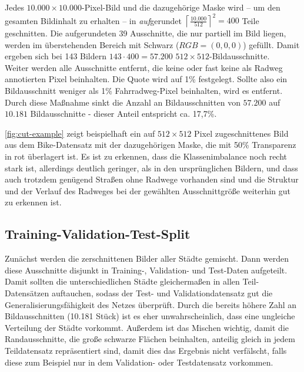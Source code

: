 Jedes $10.000\times 10.000$-Pixel-Bild und die dazugehörige Maske wird -- um den gesamten Bildinhalt zu erhalten -- in \textit{auf}gerundet
$\left\lceil{\frac{10.000}{512}}\right\rceil^2 = 400$ Teile geschnitten. 
Die aufgerundeten 39 Ausschnitte, die nur partiell im Bild liegen, werden im überstehenden Bereich mit Schwarz ($RGB=(0,0,0)$) gefüllt.
Damit ergeben sich bei 143 Bildern $143 \cdot 400 = 57.200$ $512 \times 512$-Bildausschnitte. \\
Weiter werden alle Ausschnitte entfernt, die keine oder fast keine als Radweg annotierten Pixel beinhalten. 
Die Quote wird auf 1\% festgelegt. Sollte also ein Bildausschnitt weniger als 1\% Fahrradweg-Pixel beinhalten, 
wird es entfernt. Durch diese Maßnahme sinkt die Anzahl an Bildausschnitten von $57.200$ auf $10.181$ Bildausschnitte - 
dieser Anteil entspricht ca. 17,7\%. 
 
\autoref{fig:cut-example} zeigt beispielhaft ein auf $512\times 512$ Pixel zugeschnittenes Bild aus dem Bike-Datensatz 
mit der dazugehörigen Maske, die mit 50\% Transparenz in rot überlagert ist. Es ist zu erkennen, 
dass die Klassenimbalance noch recht stark ist, allerdings deutlich geringer, als in den ursprünglichen Bildern,
und dass auch trotzdem genügend Straßen ohne Radwege vorhanden sind und die Struktur und der Verlauf des Radweges 
bei der gewählten Ausschnittgröße weiterhin gut zu erkennen ist. 

\subsection{Training-Validation-Test-Split}

Zunächst werden die zerschnittenen Bilder aller Städte gemischt. Dann werden diese Ausschnitte disjunkt in 
Training-, Validation- und Test-Daten aufgeteilt. 
Damit sollten die unterschiedlichen Städte gleichermaßen in allen Teil-Datensätzen auftauchen, 
sodass der Test- und Validationdatensatz gut die Generalisierungsfähigkeit des Netzes überprüft. 
Durch die bereits höhere Zahl an Bildausschnitten (10.181 Stück) ist es eher unwahrscheinlich, 
dass eine ungleiche Verteilung der Städte vorkommt. Außerdem ist das Mischen wichtig, 
damit die Randausschnitte, die große schwarze Flächen beinhalten, anteilig gleich in 
jedem Teildatensatz repräsentiert sind, damit dies das Ergebnis nicht verfälscht, falls diese 
zum Beispiel nur in dem Validation- oder Testdatensatz vorkommen. 

